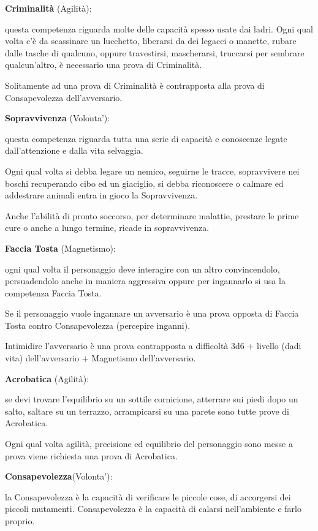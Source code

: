 \documentclass[a4paper,11pt,twoside,openany]{book}
\begin{document}
\textbf{Criminalità} (Agilità):

questa competenza riguarda molte delle capacità spesso usate dai ladri. Ogni qual volta c'è da scassinare un lucchetto, liberarsi da dei legacci o manette, rubare dalle tasche di qualcuno, oppure travestirsi, mascherarsi, truccarsi per sembrare qualcun'altro, è necessario una prova di Criminalità.

Solitamente ad una prova di Criminalità è contrapposta alla prova di Consapevolezza dell'avversario.

\textbf{Sopravvivenza} (Volonta'):

questa competenza riguarda tutta una serie di capacità e conoscenze legate dall'attenzione e dalla vita selvaggia.

Ogni qual volta si debba legare un nemico, seguirne le tracce, sopravvivere nei boschi recuperando cibo ed un giaciglio,  si debba riconoscere o calmare ed addestrare animali entra in gioco la Sopravvivenza.

Anche l'abilità di pronto soccorso, per determinare malattie, prestare le prime cure o anche a lungo termine, ricade in sopravvivenza.

\textbf{Faccia Tosta} (Magnetismo):

ogni qual volta il personaggio deve interagire con un altro convincendolo, persuadendolo anche in maniera aggressiva oppure per ingannarlo si usa la competenza Faccia Tosta.

Se il personaggio vuole ingannare un avversario è una prova opposta di Faccia Tosta contro Consapevolezza (percepire inganni).

Intimidire l'avversario è una prova contrapposta a difficoltà 3d6 + livello (dadi vita) dell'avversario + Magnetismo dell'avversario.

\textbf{Acrobatica} (Agilità):

se devi trovare l'equilibrio su un sottile cornicione, atterrare sui piedi dopo un salto, saltare su un terrazzo, arrampicarsi su una parete sono tutte prove di Acrobatica.

Ogni qual volta agilità, precisione ed equilibrio del personaggio sono messe a prova viene richiesta una prova di Acrobatica.

\textbf{Consapevolezza}(Volonta'):

la Consapevolezza è la capacità di verificare le piccole cose, di accorgersi dei piccoli mutamenti. Consapevolezza è la capacità di calarsi nell'ambiente e farlo proprio.
\end{document}
